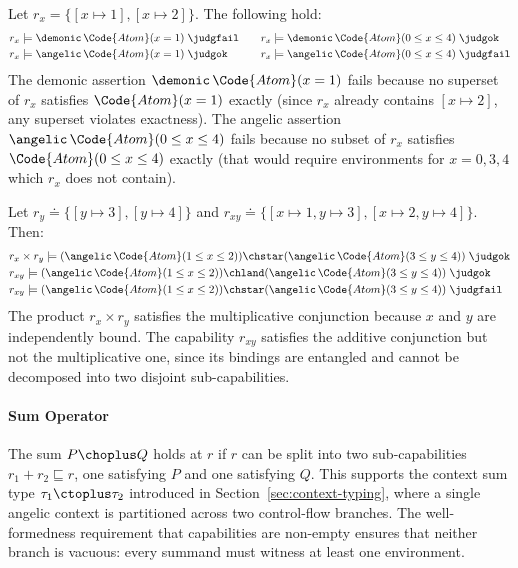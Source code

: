 \begin{example}\label{ex-approximation-modalities}
  Let $r_x = \{[x \mapsto 1], [x \mapsto 2]\}$.  The following hold:
  \begin{align*}
    &r_x \models \demonic\,\Code{Atom}(x = 1) \;\judgfail \quad
    &&r_x \models \demonic\,\Code{Atom}(0 \leq x \leq 4) \;\judgok \\
    &r_x \models \angelic\,\Code{Atom}(x = 1) \;\judgok \quad
    &&r_x \models \angelic\,\Code{Atom}(0 \leq x \leq 4) \;\judgfail
  \end{align*}
  The demonic assertion $\demonic\,\Code{Atom}(x = 1)$ fails because
  no superset of $r_x$ satisfies $\Code{Atom}(x = 1)$ exactly (since
  $r_x$ already contains $[x \mapsto 2]$, any superset violates
  exactness).  The angelic assertion $\angelic\,\Code{Atom}(0 \leq x
  \leq 4)$ fails because no subset of $r_x$ satisfies
  $\Code{Atom}(0 \leq x \leq 4)$ exactly (that would require
  environments for $x = 0, 3, 4$ which $r_x$ does not contain).

  Let $r_y \doteq \{[y \mapsto 3], [y \mapsto 4]\}$ and
      $r_{xy} \doteq \{[x \mapsto 1, y \mapsto 3], [x \mapsto 2, y \mapsto 4]\}$.
  Then:
\begin{align*}
&r_x \times r_y \models (\angelic\,\Code{Atom}(1 \leq x \leq 2)) \chstar (\angelic\,\Code{Atom}(3 \leq y \leq 4)) \;\judgok \\
&r_{xy} \models (\angelic\,\Code{Atom}(1 \leq x \leq 2)) \chland (\angelic\,\Code{Atom}(3 \leq y \leq 4)) \;\judgok \\
&r_{xy} \models (\angelic\,\Code{Atom}(1 \leq x \leq 2)) \chstar (\angelic\,\Code{Atom}(3 \leq y \leq 4)) \;\judgfail
\end{align*}
The product $r_x \times r_y$ satisfies the multiplicative conjunction
because $x$ and $y$ are independently bound.  The capability $r_{xy}$
satisfies the additive conjunction but not the multiplicative one,
since its bindings are entangled and cannot be decomposed into two
disjoint sub-capabilities.

\end{example}

\paragraph{Sum Operator}
The sum $P \choplus Q$ holds at $r$ if $r$ can be split into two
sub-capabilities $r_1 + r_2 \sqsubseteq r$, one satisfying $P$ and
one satisfying $Q$.  This supports the context sum type $\tau_1
\ctoplus \tau_2$ introduced in Section~\ref{sec:context-typing}, where a
single angelic context is partitioned across two control-flow branches.
The well-formedness requirement that capabilities are non-empty ensures
that neither branch is vacuous: every summand must witness at least one
environment.

